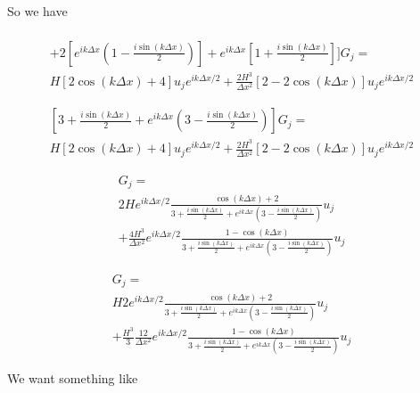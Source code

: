 \documentclass[12pt]{article}
\begin{document}
 So we have 
 
 \begin{multline}
 [\left(1  - \frac{i\sin\left(k\Delta x\right)}{2} \right) +  2 \left[1  + \frac{i\sin\left(k\Delta x\right)}{2}\right] \\+  2 \left[e^{ik\Delta x}\left(1  - \frac{i\sin\left(k\Delta x\right)}{2} \right)\right]  +  e^{ik\Delta x} \left[1  + \frac{i\sin\left(k\Delta x\right)}{2}\right] ] G_j = \\ H\left[2 \cos \left(k\Delta x\right) + 4 \right] u_{j}e^{ ik\Delta x/2} +  \frac{2H^3}{\Delta x^2}\left[ 2 -  2\cos \left(k\Delta x\right) \right] u_{j}e^{ ik\Delta x/2}
 \end{multline}
 
 \begin{multline}
  \left[3   + \frac{i\sin\left(k\Delta x\right)}{2} + e^{ik\Delta x}\left(3   - \frac{i\sin\left(k\Delta x\right)}{2}\right)  \right] G_j = \\ H\left[2 \cos \left(k\Delta x\right) + 4 \right] u_{j}e^{ ik\Delta x/2} +  \frac{2H^3}{\Delta x^2}\left[ 2 -  2\cos \left(k\Delta x\right) \right] u_{j}e^{ ik\Delta x/2}
  \end{multline}

\begin{multline}
G_j = \\ 2H e^{ ik\Delta x/2} \frac{\cos \left(k\Delta x\right) + 2}{3   + \frac{i\sin\left(k\Delta x\right)}{2} + e^{ik\Delta x}\left(3   - \frac{i\sin\left(k\Delta x\right)}{2}\right)} u_{j}  \\+  \frac{4H^3}{\Delta x^2} e^{ ik\Delta x/2}\frac{ 1 -  \cos \left(k\Delta x\right)}{3   + \frac{i\sin\left(k\Delta x\right)}{2} + e^{ik\Delta x}\left(3   - \frac{i\sin\left(k\Delta x\right)}{2}\right)} u_{j}
\end{multline}

\begin{multline}
G_j = \\ H2 e^{ ik\Delta x/2} \frac{\cos \left(k\Delta x\right) + 2}{3   + \frac{i\sin\left(k\Delta x\right)}{2} + e^{ik\Delta x}\left(3   - \frac{i\sin\left(k\Delta x\right)}{2}\right)} u_{j}  \\+ \frac{H^3}{3} \frac{12}{\Delta x^2} e^{ ik\Delta x/2}\frac{ 1 -  \cos \left(k\Delta x\right)}{3   + \frac{i\sin\left(k\Delta x\right)}{2} + e^{ik\Delta x}\left(3   - \frac{i\sin\left(k\Delta x\right)}{2}\right)} u_{j}
\end{multline}

We want something like
\end{document}

